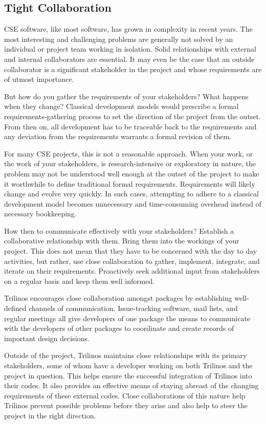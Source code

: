 \documentclass[times,10pt,twocolumn]{article}
\begin{document}
\subsection{Tight Collaboration}

CSE software, like most software, has grown in complexity in recent
years. The most interesting and challenging problems are generally
not solved by an individual or project team working in isolation.
Solid relationships with external and internal collaborators are
essential.  It may even be the case that an outside collaborator is
a significant stakeholder in the project and whose requirements are
of utmost importance.

But how do you gather the requirements of your stakeholders?  What
happens when they change?  Classical development models would
prescribe a formal requirements-gathering process to set the
direction of the project from the outset.  From then on, all
development has to be traceable back to the requirements and any
deviation from the requirements warrants a formal revision of them.

For many CSE projects, this is not a reasonable approach.  When your
work, or the work of your stakeholders, is research-intensive or
exploratory in nature, the problem may not be understood well enough
at the outset of the project to make it worthwhile to define
traditional formal requirements.  Requirements will likely change
and evolve very quickly.  In such cases, attempting to adhere to a
classical development model becomes unnecessary and time-consuming
overhead instead of necessary bookkeeping.

How then to communicate effectively with your stakeholders?
Establish a collaborative relationship with them.  Bring them into
the workings of your project.  This does not mean that they have to
be concerned with the day to day activities, but rather, use close
collaboration to gather, implement, integrate, and iterate on their
requirements.  Proactively seek additional input from stakeholders
on a regular basis and keep them well informed.

Trilinos encourages close collaboration amongst packages by
establishing well-defined channels of communication.  Issue-tracking
software, mail lists, and regular meetings all give developers of
one package the means to communicate with the developers of other
packages to coordinate and create records of important design decisions.

Outside of the project, Trilinos maintains close relationships with
its primary stakeholders, some of whom have a developer working on
both Trilinos and the project in question.  This helps ensure the
successful integration of Trilinos into their codes.  It also
provides an effective means of staying abreast of the changing
requirements of these external codes.  Close collaborations of this
nature help Trilinos prevent possible problems before they arise and
also help to steer the project in the right direction.
\end{document}
